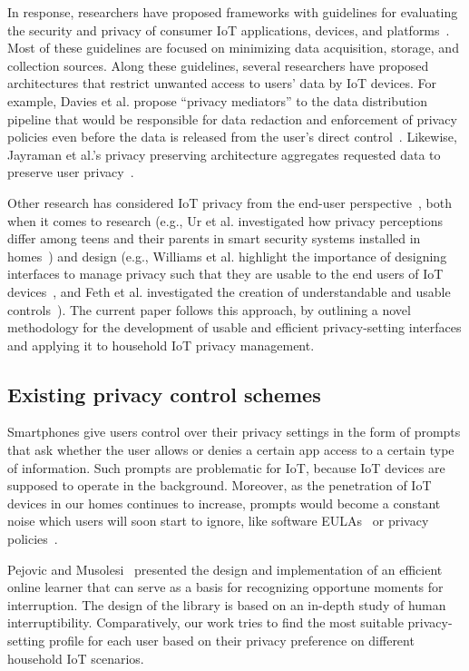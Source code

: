 In response, researchers have proposed frameworks with guidelines for evaluating the security and privacy of consumer IoT applications, devices, and platforms~\cite{perera_privacy-by-design_2016, loi_systematically_2017}. Most of these guidelines are focused on minimizing data acquisition, storage, and collection sources. Along these guidelines, several researchers have proposed architectures that restrict unwanted access to users' data by IoT devices. For example, Davies et al. propose ``privacy mediators'' to the data distribution pipeline that would be responsible for data redaction and enforcement of privacy policies even before the data is released from the user's direct control~\cite{davies_privacy_2016}. Likewise, Jayraman et al.'s privacy preserving architecture aggregates requested data to preserve user privacy~\cite{jayaraman_privacy_2017}.

Other research has considered IoT privacy from the end-user perspective~\cite{feth_user-centered_2017}, both when it comes to research (e.g., Ur et al. investigated how privacy perceptions differ among teens and their parents in smart security systems installed in homes~\cite{ur_intruders_2014}) and design (e.g., Williams et al. highlight the importance of designing interfaces to manage privacy such that they are usable to the end users of IoT devices~\cite{williams2016perfect}, and Feth et al. investigated the creation of understandable and usable controls~\cite{feth_user-centered_2017}). The current paper follows this approach, by outlining a novel methodology for the development of usable and efficient privacy-setting interfaces and applying it to household IoT privacy management. 

\subsection{Existing privacy control schemes}
Smartphones give users control over their privacy settings in the form of prompts that ask whether the user allows or denies a certain app access to a certain type of information. Such prompts are problematic for IoT, because IoT devices are supposed to operate in the background. Moreover, as the penetration of IoT devices in our homes continues to increase, prompts would become a constant noise which users will soon start to ignore, like software EULAs~\cite{good2005spyware} or privacy policies~\cite{jensen2004privacy}.

Pejovic and Musolesi~\cite{Pejovic2014} presented the design and implementation of an efficient online learner that can serve as a basis for recognizing opportune moments for interruption. The design of the library is based on an in-depth study of human interruptibility. Comparatively, our work tries to find the most suitable privacy-setting profile for each user based on their privacy preference on different household IoT scenarios.

